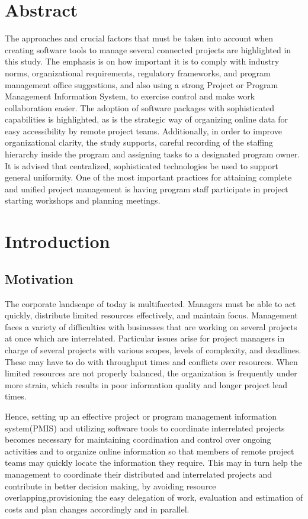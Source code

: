 \documentclass{llncs}
\begin{document}
\section{Abstract}
The approaches and crucial factors that must be taken into account when creating software tools to manage several connected projects are highlighted in this study. The emphasis is on how important it is to comply with industry norms, organizational requirements, regulatory frameworks, and program management office suggestions, and also using a strong Project or Program Management Information System, to exercise control and make work collaboration easier. The adoption of software packages with sophisticated capabilities is highlighted, as is the strategic way of organizing online data for easy accessibility by remote project teams. Additionally, in order to improve organizational clarity, the study supports, careful recording of the staffing hierarchy inside the program and assigning tasks to a designated program owner. It is advised that centralized, sophisticated technologies be used to support general uniformity. One of the most important practices for attaining complete and unified project management is having program staff participate in project starting workshops and planning meetings.



\tableofcontents
\newpage

\section{Introduction}

\subsection{Motivation}
The corporate landscape of today is multifaceted. Managers must be able to act quickly, distribute limited resources effectively, and maintain focus. Management faces a variety of difficulties with businesses that are working on several projects at once which are interrelated. Particular issues arise for project managers in charge of several projects with various scopes, levels of complexity, and deadlines. These may have to do with throughput times and conflicts over resources. When limited resources are not properly balanced, the organization is frequently under more strain, which results in poor information quality and longer project lead times.~\cite{refpaper1}

Hence, setting up an effective project or program management information system(PMIS) and utilizing software tools to coordinate interrelated projects becomes necessary for maintaining coordination and control over ongoing activities and to organize online information so that members of remote project teams may quickly locate the information they require. This may in turn help the management to coordinate their distributed and interrelated projects and contribute in better decision making, by avoiding resource overlapping,provisioning the easy delegation of work, evaluation and estimation of costs and plan changes accordingly and in parallel.~\cite{refpaper1}
\end{document}
